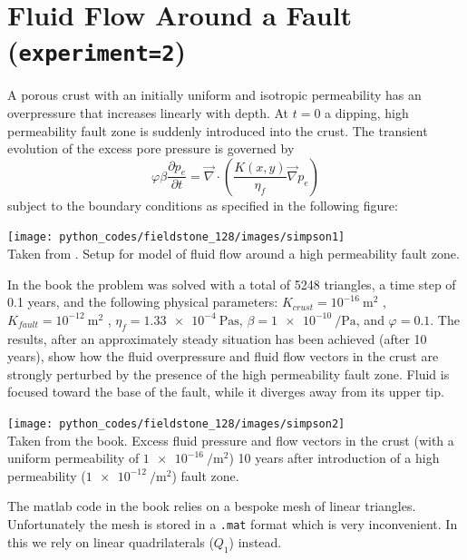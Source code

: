 \section*{Fluid Flow Around a Fault ({\tt experiment=2})}

A porous crust with an initially uniform and isotropic permeability has an
overpressure that increases linearly with depth. At $t=0$ a dipping, high permeability fault zone is
suddenly introduced into the crust.
The transient evolution of the excess pore pressure is governed by
\begin{equation}
\varphi \beta  \frac{\partial p_e}{\partial t}
=
\vec\nabla \cdot \left( \frac{K(x,y)}{\eta_f} \vec\nabla p_e  \right) 
\end{equation}
subject to the boundary conditions as specified in the following figure:
\begin{center}
\texttt{[image: python\_codes/fieldstone\_128/images/simpson1]}\\
{\captionfont Taken from \cite{simp17}. Setup for model of fluid flow around a high permeability fault zone.}
\end{center}

In the book the problem was solved with a total of 5248 triangles, 
a time step of 0.1 years, and the following physical parameters:
$K_{crust}=10^{-16}~\si{\square\meter}$ , 
$K_{fault}=10^{-12}~\si{\square\meter}$ , 
$\eta_f  = \SI{1.33e-4}{\pascal\second}$, 
$\beta=\SI{1e-10}{\per\pascal}$, and $\varphi=0.1$. 
The results, after an approximately steady situation has been achieved (after 10 years), show how the fluid overpressure
and fluid flow vectors in the crust are strongly perturbed by the presence of the high permeability
fault zone. Fluid is focused toward the base of the fault, while it diverges away from its upper tip.
\begin{center}
\texttt{[image: python\_codes/fieldstone\_128/images/simpson2]}\\
{\captionfont Taken from the book\cite{simp17}. Excess fluid pressure and flow vectors in the crust 
(with a uniform permeability of $\SI{1e-16}{\per\square\meter}$) 10 years after
introduction of a high permeability ($\SI{1e-12}{\per\square\meter}$) fault zone.}
\end{center}

The matlab code in the book relies on a bespoke mesh of linear triangles. Unfortunately the 
mesh is stored in a {\tt .mat} format which is very inconvenient. In this \stone we rely on 
linear quadrilaterals ($Q_1$) instead. 

